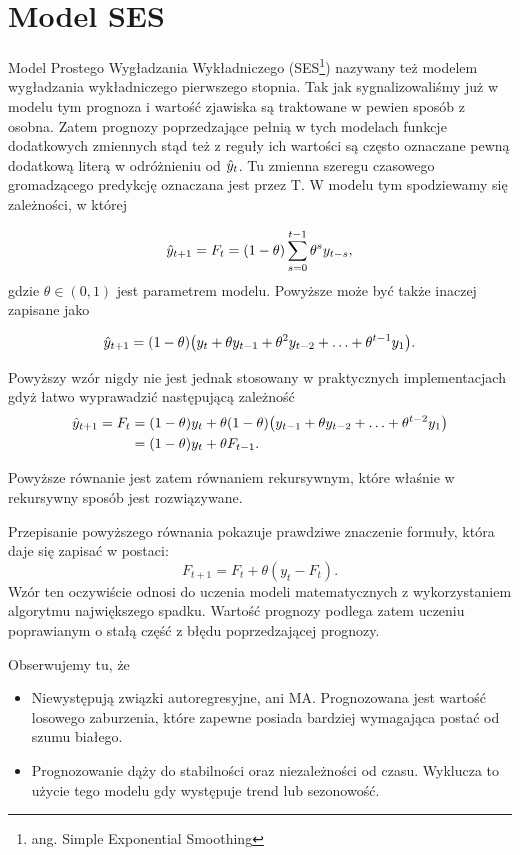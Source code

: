 \documentclass[10pt,a4paper]{book}
\begin{document}
\section{Model SES}

Model Prostego Wygładzania Wykładniczego (SES\footnote{ang. Simple Exponential Smoothing}) nazywany też modelem wygładzania wykładniczego pierwszego stopnia. Tak jak sygnalizowaliśmy już w modelu tym prognoza i wartość zjawiska są traktowane w pewien sposób z osobna. Zatem prognozy poprzedzające pełnią w tych modelach funkcje dodatkowych zmiennych stąd też z reguły ich wartości są często oznaczane pewną dodatkową literą w odróżnieniu od $\predict{y}{t}$. Tu zmienna szeregu czasowego gromadzącego predykcję oznaczana jest przez T.  W modelu tym spodziewamy się zależności,  w której

$$
\predict{y}{t+1} =  F_t = (1 - \theta) \sum_{s=0}^{t-1} \theta^s y_{t-s},
$$
gdzie $\theta \in (0,1)$ jest parametrem modelu. Powyższe może być także inaczej zapisane jako

$$
\predict{y}{t+1} = (1- \theta) \bracket{ y_t + \theta y_{t-1} + \theta^2 y_{t-2}+ \ldots + \theta^{t-1} y_{1}}.
$$

Powyższy wzór nigdy nie jest jednak stosowany w praktycznych implementacjach gdyż łatwo wyprawadzić następującą zależność 
\begin{align*}
\predict{y}{t+1} = F_t &= (1-\theta) y_t + \theta (1-\theta) \bracket{y_{t-1} + \theta y_{t-2} + \ldots + \theta^{t-2} y_1} \\
&=  (1-\theta ) y_t + \theta F_{t-1}. 
\end{align*}

Powyższe równanie jest zatem równaniem rekursywnym, które właśnie w rekursywny sposób jest rozwiązywane.

Przepisanie powyższego równania pokazuje prawdziwe znaczenie formuły, która daje się zapisać w postaci:
$$
F_{t+1} = F_{t} + \theta (y_t - F_t).
$$
Wzór ten oczywiście odnosi do uczenia modeli matematycznych z wykorzystaniem algorytmu największego spadku. Wartość prognozy podlega zatem uczeniu poprawianym o stałą część z błędu poprzedzającej prognozy.

Obserwujemy tu, że 
\begin{itemize}
\item Niewystępują związki autoregresyjne, ani MA. Prognozowana jest wartość losowego zaburzenia, które zapewne posiada bardziej wymagająca postać od szumu białego.
\item Prognozowanie dąży do stabilności oraz niezależności od czasu. Wyklucza to użycie tego modelu gdy występuje trend lub sezonowość.
\end{itemize}
\end{document}
